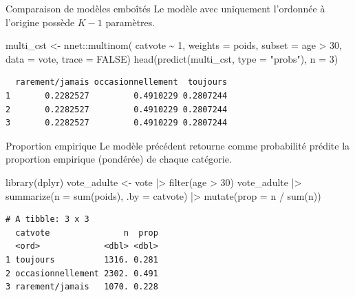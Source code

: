 \documentclass[
  ignorenonframetext,
]{beamer}
\newenvironment{Shaded}{\begin{snugshade}}{\end{snugshade}}
\newcommand{\AttributeTok}[1]{\textcolor[rgb]{0.40,0.45,0.13}{#1}}
\newcommand{\ConstantTok}[1]{\textcolor[rgb]{0.56,0.35,0.01}{#1}}
\newcommand{\DecValTok}[1]{\textcolor[rgb]{0.68,0.00,0.00}{#1}}
\newcommand{\FunctionTok}[1]{\textcolor[rgb]{0.28,0.35,0.67}{#1}}
\newcommand{\NormalTok}[1]{\textcolor[rgb]{0.00,0.23,0.31}{#1}}
\newcommand{\OtherTok}[1]{\textcolor[rgb]{0.00,0.23,0.31}{#1}}
\newcommand{\SpecialCharTok}[1]{\textcolor[rgb]{0.37,0.37,0.37}{#1}}
\newcommand{\StringTok}[1]{\textcolor[rgb]{0.13,0.47,0.30}{#1}}
\begin{document}
\begin{frame}[fragile]{Comparaison de modèles emboîtés}
\label{comparaison-de-moduxe8les-embouxeetuxe9s}
Le modèle avec uniquement l'ordonnée à l'origine possède \(K-1\)
paramètres.

\begin{Shaded}
\begin{Highlighting}[numbers=left,,]
\NormalTok{multi\_cst }\OtherTok{\textless{}{-}}\NormalTok{ nnet}\SpecialCharTok{::}\FunctionTok{multinom}\NormalTok{(}
\NormalTok{  catvote }\SpecialCharTok{\textasciitilde{}} \DecValTok{1}\NormalTok{,}
  \AttributeTok{weights =}\NormalTok{ poids,}
  \AttributeTok{subset =}\NormalTok{ age }\SpecialCharTok{\textgreater{}} \DecValTok{30}\NormalTok{,}
  \AttributeTok{data =}\NormalTok{ vote,}
  \AttributeTok{trace =} \ConstantTok{FALSE}\NormalTok{)}
\FunctionTok{head}\NormalTok{(}\FunctionTok{predict}\NormalTok{(multi\_cst, }\AttributeTok{type =} \StringTok{"probs"}\NormalTok{), }\AttributeTok{n =} \DecValTok{3}\NormalTok{)}
\end{Highlighting}
\end{Shaded}

\begin{verbatim}
  rarement/jamais occasionnellement  toujours
1       0.2282527         0.4910229 0.2807244
2       0.2282527         0.4910229 0.2807244
3       0.2282527         0.4910229 0.2807244
\end{verbatim}
\end{frame}

\begin{frame}[fragile]{Proportion empirique}
\label{proportion-empirique}
Le modèle précédent retourne comme probabilité prédite la proportion
empirique (pondérée) de chaque catégorie.

\begin{Shaded}
\begin{Highlighting}[numbers=left,,]
\FunctionTok{library}\NormalTok{(dplyr)}
\NormalTok{vote\_adulte }\OtherTok{\textless{}{-}}\NormalTok{ vote }\SpecialCharTok{|\textgreater{}}  \FunctionTok{filter}\NormalTok{(age }\SpecialCharTok{\textgreater{}} \DecValTok{30}\NormalTok{)}
\NormalTok{vote\_adulte }\SpecialCharTok{|\textgreater{}} 
  \FunctionTok{summarize}\NormalTok{(}\AttributeTok{n =} \FunctionTok{sum}\NormalTok{(poids), }\AttributeTok{.by =}\NormalTok{ catvote) }\SpecialCharTok{|\textgreater{}}
  \FunctionTok{mutate}\NormalTok{(}\AttributeTok{prop =}\NormalTok{ n }\SpecialCharTok{/} \FunctionTok{sum}\NormalTok{(n))}
\end{Highlighting}
\end{Shaded}

\begin{verbatim}
# A tibble: 3 x 3
  catvote               n  prop
  <ord>             <dbl> <dbl>
1 toujours          1316. 0.281
2 occasionnellement 2302. 0.491
3 rarement/jamais   1070. 0.228
\end{verbatim}
\end{frame}
\end{document}
